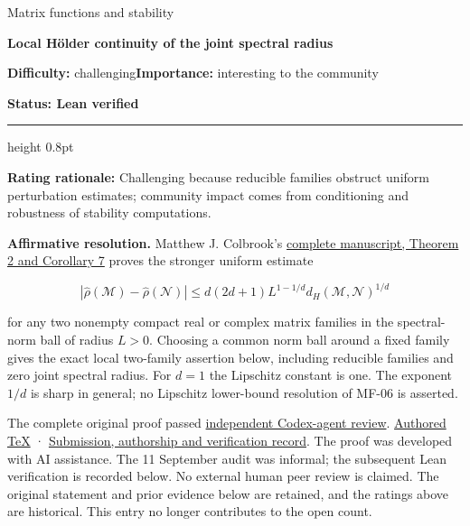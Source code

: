 \documentclass[11pt,a4paper]{article}
\makeatletter
\renewcommand{\subsection}{\Needspace{4\baselineskip}\@startsection{subsection}{2}{0pt}{9pt plus 1pt minus 1pt}{3pt}{\sffamily\bfseries\normalsize\color{ink}}}
\makeatother
\begin{document}
{\sffamily\small\color{muted}Matrix functions and stability\par}
\vspace{3pt}
{\raggedright{}\sffamily\bfseries\fontsize{21}{24}\selectfont\color{ink}Local
Hölder continuity of the joint spectral radius\par}
\vspace{7pt}
{\sffamily\small\textbf{Difficulty:} challenging\quad\textbf{Importance:} interesting
to the community\par}
{\sffamily\small\bfseries\color{accent}Status: Lean verified\par}
\vspace{4pt}
{\color{accent}\hrule height 0.8pt}
\vspace{6pt}
\textbf{Rating rationale:} Challenging because reducible families
obstruct uniform perturbation estimates; community impact comes from
conditioning and robustness of stability computations.

\subsection{Resolution --- 2026-09-11}\label{resolution-2026-09-11}

\textbf{Affirmative resolution.} Matthew J. Colbrook's
\href{https://github.com/ajt60gaibb/OpenProblemsInNLA/blob/main/references/colbrook-jsr-growth-2026-09-11/manuscripts/uniform_growth_and_holder.pdf}{complete
manuscript, Theorem 2 and Corollary 7} proves the stronger uniform
estimate

\[|\widehat\rho(\mathcal M)-\widehat\rho(\mathcal N)|
\le d(2d+1)L^{1-1/d}d_H(\mathcal M,\mathcal N)^{1/d}\]

for any two nonempty compact real or complex matrix families in the
spectral-norm ball of radius \(L>0\). Choosing a common norm ball around
a fixed family gives the exact local two-family assertion below,
including reducible families and zero joint spectral radius. For \(d=1\)
the Lipschitz constant is one. The exponent \(1/d\) is sharp in general;
no Lipschitz lower-bound resolution of MF-06 is asserted.

The complete original proof passed
\href{https://github.com/ajt60gaibb/OpenProblemsInNLA/blob/main/references/colbrook-jsr-growth-2026-09-11/verification/reviews/MF-05-MF-07-review.md}{independent
Codex-agent review}.
\href{https://github.com/ajt60gaibb/OpenProblemsInNLA/blob/main/references/colbrook-jsr-growth-2026-09-11/manuscripts/uniform_growth_and_holder.tex}{Authored
TeX} ·
\href{https://github.com/ajt60gaibb/OpenProblemsInNLA/blob/main/references/colbrook-jsr-growth-2026-09-11/README.md}{Submission,
authorship and verification record}. The proof was developed with AI
assistance. The 11 September audit was informal; the subsequent Lean
verification is recorded below. No external human peer review is
claimed. The original statement and prior evidence below are retained,
and the ratings above are historical. This entry no longer contributes
to the open count.
\end{document}
